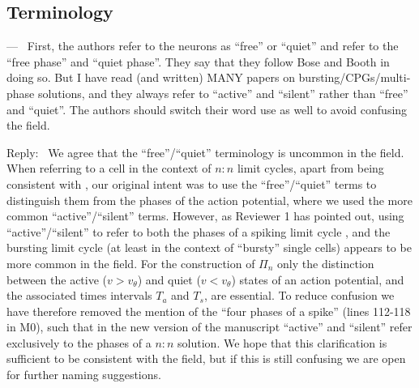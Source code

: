 \documentclass[utf8]{article}
\newcounter{point}[section]
\newenvironment{point}
{\refstepcounter{point} \bigskip \noindent {\textbf{Point~P\thesubsection.\arabic{point}} } ---\ }
{\par }
\newenvironment{reply}
{\medskip \noindent Reply:\  }
		{\medskip}
\begin{document}
\subsection{Terminology}
\setcounter{point}{0}

\begin{point}
	First, the authors refer to the neurons as ``free'' or ``quiet'' and refer to the ``free phase'' and ``quiet phase''.
	They say that they follow Bose and Booth in doing so.
	But I have read (and written) MANY papers on bursting\slash CPGs\slash multi-phase solutions, and they always refer to ``active'' and ``silent'' rather than ``free'' and ``quiet''.
	The authors should switch their word use as well to avoid confusing the field.
\end{point}
\begin{reply}
	We agree that the ``free''\slash``quiet'' terminology is uncommon in the field.
	When referring to a cell in the context of $n:n$ limit cycles, apart from being consistent with \citet{bose2011}, our original intent was to use the ``free''\slash``quiet'' terms to distinguish them from the phases of the action potential, where we used the more common ``active''\slash ``silent'' terms.
	However, as Reviewer 1 has pointed out, using ``active''\slash``silent'' to refer to both the phases of a spiking limit cycle \cite[e.g.~p.~250]{ermentrout2010}, and the bursting limit cycle \cite[e.g.~p.~103]{ermentrout2010} (at least in the context of ``bursty'' single cells) appears to be more common in the field.
	For the construction of $\Pi_{n}$ only the distinction between the active ($v>v_{\theta}$) and quiet ($v<v_{\theta}$) states of an action potential, and the associated times intervals $T_{a}$ and $T_{s}$, are essential.
	To reduce confusion we have therefore removed the mention of the ``four phases of a spike'' (lines 112-118 in M0), such that in the new version of the manuscript ``active'' and ``silent'' refer exclusively to the phases of a $n:n$ solution.
	We hope that this clarification is sufficient to be consistent with the field, but if this is still confusing we are open for further naming suggestions.
\end{reply}
\end{document}
